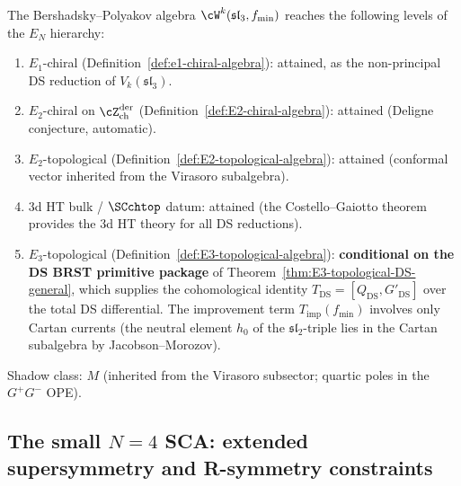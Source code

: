 \begin{remark}
\label{rem:bp-EN-level}
The Bershadsky--Polyakov algebra $\cW^k(\mathfrak{sl}_3, f_{\min})$
reaches the following levels of the $E_N$ hierarchy:
\begin{enumerate}[label=\textup{(\roman*)}]
\item $E_1$-chiral
 (Definition~\ref{def:e1-chiral-algebra}): attained, as
 the non-principal DS reduction of $V_k(\mathfrak{sl}_3)$.
\item $E_2$-chiral on $\cZ^{\mathrm{der}}_{\mathrm{ch}}$
 (Definition~\ref{def:E2-chiral-algebra}): attained
 (Deligne conjecture, automatic).
\item $E_2$-topological
 (Definition~\ref{def:E2-topological-algebra}): attained
 (conformal vector inherited from the Virasoro subalgebra).
\item 3d HT bulk / $\SCchtop$ datum: attained
 (the Costello--Gaiotto theorem provides the 3d HT theory for all
 DS reductions).
\item $E_3$-topological
 (Definition~\ref{def:E3-topological-algebra}):
 \textbf{conditional on the DS BRST primitive package}
 of Theorem~\ref{thm:E3-topological-DS-general}, which supplies the
 cohomological identity
 $T_{\mathrm{DS}} = [Q_{\mathrm{DS}}, G'_{\mathrm{DS}}]$
 over the total DS differential.
 The improvement term $T_{\mathrm{imp}}(f_{\min})$ involves
 only Cartan currents (the neutral element $h_0$ of the
 $\mathfrak{sl}_2$-triple lies in the Cartan subalgebra
 by Jacobson--Morozov).
\end{enumerate}
Shadow class: $M$ (inherited from the Virasoro subsector;
quartic poles in the $G^+G^-$ OPE).
\end{remark}


%
%

\subsection{The small \texorpdfstring{$N{=}4$}{N=4} SCA: extended
 supersymmetry and R-symmetry constraints}
\label{subsec:n4-sca}

